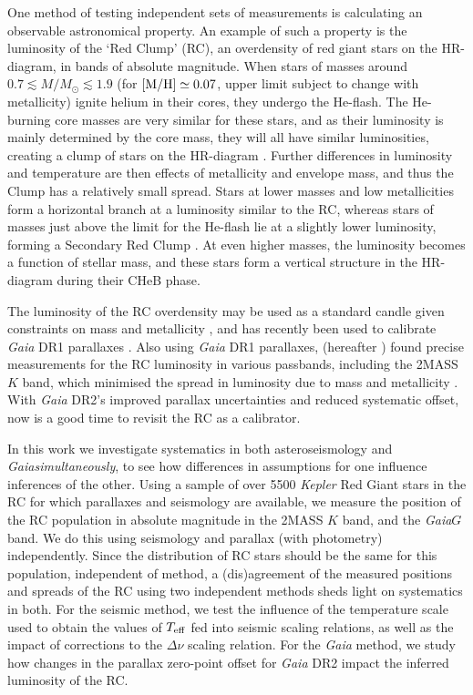 \documentclass[fleqn,usenatbib]{mnras}
\newcommand{\dnu}{\mbox{$\Delta \nu$}\xspace}
\newcommand{\teff}{\mbox{$T_{\rm eff}$}\xspace}
\newcommand{\kepler}{\emph{Kepler}\xspace}
\newcommand{\gaia}{\emph{Gaia}\xspace}
\newcommand{\Ks}{\mbox{$K$}\xspace}
\newcommand{\new}[1]{#1}
\newcommand{\nnew}[1]{#1}
\begin{document}
One method of testing independent sets of measurements is calculating an observable astronomical property. An example of such a property is the luminosity of the `Red Clump' (RC), an overdensity of red giant stars on the HR-diagram, in bands of absolute magnitude. When stars of masses around \new{$0.7 \lesssim M/M_\odot \lesssim 1.9$ (for $[\rm{M/H}] \simeq 0.07$, upper limit subject to change with metallicity)} ignite helium in their cores, they undergo the He-flash. The \nnew{He-burning} core masses are \nnew{very similar} for these stars, and as their luminosity is mainly determined by the core mass, they will all have similar luminosities, creating a clump of stars on the HR-diagram \citep[][and references therein]{art:girardi2016}. \nnew{Further differences in luminosity and temperature are then effects of metallicity and envelope mass,} \new{and thus the Clump has a relatively small spread.} Stars at lower masses and low metallicities form a horizontal branch at a luminosity similar to the RC, \nnew{whereas stars of masses just above the limit for the He-flash lie at a slightly lower luminosity,} forming a Secondary Red Clump \citep[2CL,][]{art:girardi1999}. At even higher masses, the luminosity becomes a function of stellar mass, and these stars form a vertical structure in the HR-diagram during their CHeB phase.

The luminosity of the RC overdensity may be used as a standard candle given constraints on mass and metallicity \citep{art:cannon1970}, and has recently been used to calibrate \gaia DR1 parallaxes \citep{art:davies+2017}. Also using \gaia DR1 parallaxes, \cite{art:hawkins+2017} (hereafter ) found precise measurements for the RC luminosity in various passbands, including the 2MASS \Ks band, which minimised the spread in luminosity due to mass and metallicity \citep{art:salaris+girardi2002}. With \gaia DR2's improved parallax uncertainties and reduced systematic offset, now is a good time to revisit the RC as a calibrator.

In this work we investigate systematics in both asteroseismology and \gaia \textit{simultaneously}, to see how differences in assumptions for one influence inferences of the other. Using a sample of over 5500 \kepler Red Giant stars in the RC for which parallaxes and seismology are available, we measure the position of the RC population in absolute magnitude in the 2MASS \citep{art:skrutskie+2006} \Ks band, and the \gaia $G$ band. We do this using seismology and parallax (with photometry) independently. \new{Since the distribution of RC stars should be the same for this population, independent of method, a (dis)agreement of the measured positions and spreads of the RC using two independent methods sheds light on systematics in both.} For the seismic method, we test the influence of the temperature scale used to obtain the values of \teff fed into seismic scaling relations, as well as the impact of corrections to the \dnu scaling relation. For the \gaia method, we study how changes in the parallax zero-point offset for \gaia DR2 impact the inferred luminosity of the RC.
\end{document}
